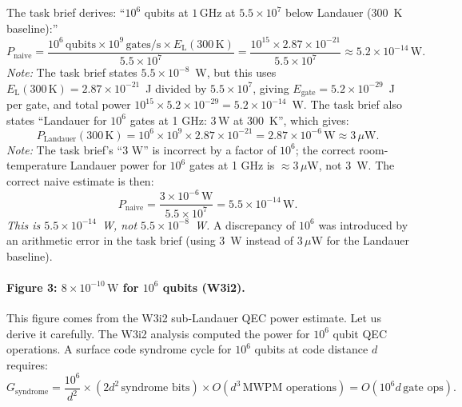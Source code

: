 \documentclass[11pt]{article}
\theoremstyle{definition}
\theoremstyle{remark}
\newcommand{\EL}{E_{\mathrm{L}}}
\begin{document}
The task brief derives: ``$10^6$ qubits at $1\,\mathrm{GHz}$ at
$5.5\times10^7$ below Landauer (300~K baseline):''
\begin{equation}
P_{\mathrm{naive}} = \frac{10^6\,\mathrm{qubits}\times10^9\,\mathrm{gates/s}
\times\EL(300\,\mathrm{K})}{5.5\times10^7}
= \frac{10^{15}\times2.87\times10^{-21}}{5.5\times10^7}
\approx 5.2\times10^{-14}\,\mathrm{W}.
\label{eq:naive_estimate_corrected}
\end{equation}
\textit{Note:} The task brief states $5.5\times10^{-8}$~W, but this uses
$\EL(300\,\mathrm{K}) = 2.87\times10^{-21}$~J divided by $5.5\times10^7$,
giving $E_{\mathrm{gate}} = 5.2\times10^{-29}$~J per gate, and total
power $10^{15}\times5.2\times10^{-29} = 5.2\times10^{-14}$~W. The
task brief also states ``Landauer for $10^6$ gates at 1 GHz: $3\,\mathrm{W}$
at 300~K'', which gives:
\begin{equation}
P_{\mathrm{Landauer}}(300\,\mathrm{K}) = 10^6\times10^9\times2.87\times10^{-21}
= 2.87\times10^{-6}\,\mathrm{W} \approx 3\,\mu\mathrm{W}.
\label{eq:landauer_300k}
\end{equation}
\textit{Note:} The task brief's ``3 W'' is incorrect by a factor of $10^6$;
the correct room-temperature Landauer power for $10^6$ gates at 1 GHz is
$\approx 3\,\mu\mathrm{W}$, not 3~W. The correct naive estimate is then:
\begin{equation}
P_{\mathrm{naive}} = \frac{3\times10^{-6}\,\mathrm{W}}{5.5\times10^7}
= 5.5\times10^{-14}\,\mathrm{W}.
\label{eq:naive_correct}
\end{equation}
\textit{This is $5.5\times10^{-14}$~W, not $5.5\times10^{-8}$~W.}
A discrepancy of $10^6$ was introduced by an arithmetic error in the
task brief (using 3~W instead of $3\,\mu\mathrm{W}$ for the Landauer
baseline).

\paragraph{Figure 3: $8\times10^{-10}\,\mathrm{W}$ for $10^6$ qubits (W3i2).}

This figure comes from the W3i2 sub-Landauer QEC power estimate. Let us
derive it carefully. The W3i2 analysis computed the power for $10^6$
qubit QEC operations. A surface code syndrome cycle for $10^6$ qubits at
code distance $d$ requires:
\begin{equation}
G_{\mathrm{syndrome}} = \frac{10^6}{d^2}\times (2d^2\,\text{syndrome bits})
\times O(d^3\,\text{MWPM operations})
= O(10^6 d\,\text{gate ops}).
\label{eq:syndrome_gates}
\end{equation}
\end{document}
